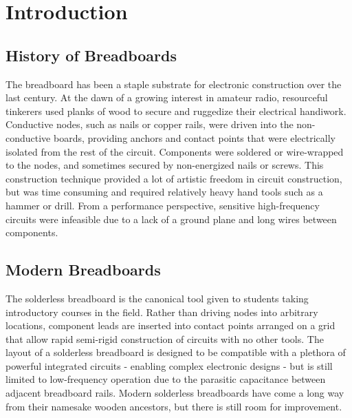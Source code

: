 \documentclass[11pt,twoside]{mitthesis}
\begin{document}
\fi


\chapter{Introduction}

\section{History of Breadboards}

The breadboard has been a staple substrate for electronic construction over the last century.
At the dawn of a growing interest in amateur radio, resourceful tinkerers used planks of wood to secure and ruggedize their electrical handiwork.
Conductive nodes, such as nails or copper rails, were driven into the non-conductive boards, providing anchors and contact points that were electrically isolated from the rest of the circuit.
Components were soldered or wire-wrapped to the nodes, and sometimes secured by non-energized nails or screws.
This construction technique provided a lot of artistic freedom in circuit construction, but was time consuming and required relatively heavy hand tools such as a hammer or drill.
From a performance perspective, sensitive high-frequency circuits were infeasible due to a lack of a ground plane and long wires between components.


\section{Modern Breadboards}

The solderless breadboard is the canonical tool given to students taking introductory courses in the field.
Rather than driving nodes into arbitrary locations, component leads are inserted into contact points arranged on a grid that allow rapid semi-rigid construction of circuits with no other tools.
The layout of a solderless breadboard is designed to be compatible with a plethora of powerful integrated circuits - enabling complex electronic designs - but is still limited to low-frequency operation due to the parasitic capacitance between adjacent breadboard rails.
Modern solderless breadboards have come a long way from their namesake wooden ancestors, but there is still room for improvement.
\end{document}
